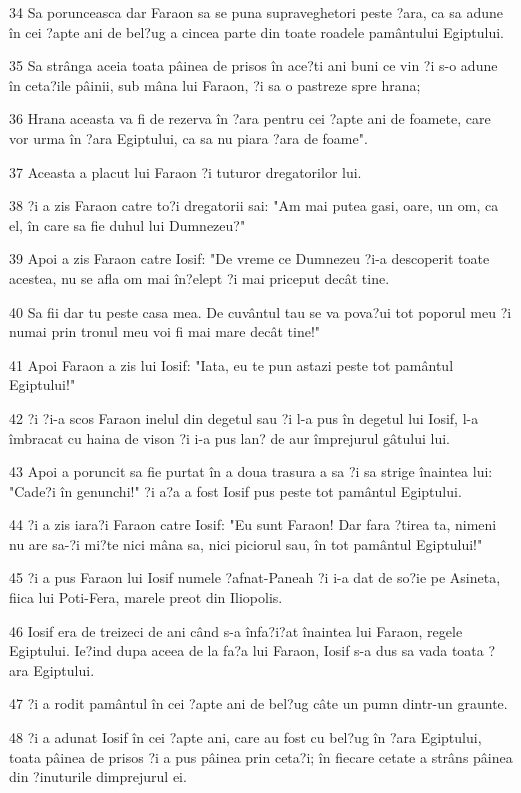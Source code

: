 \par 34 Sa porunceasca dar Faraon sa se puna supraveghetori peste ?ara, ca sa adune în cei ?apte ani de bel?ug a cincea parte din toate roadele pamântului Egiptului.
\par 35 Sa strânga aceia toata pâinea de prisos în ace?ti ani buni ce vin ?i s-o adune în ceta?ile pâinii, sub mâna lui Faraon, ?i sa o pastreze spre hrana;
\par 36 Hrana aceasta va fi de rezerva în ?ara pentru cei ?apte ani de foamete, care vor urma în ?ara Egiptului, ca sa nu piara ?ara de foame".
\par 37 Aceasta a placut lui Faraon ?i tuturor dregatorilor lui.
\par 38 ?i a zis Faraon catre to?i dregatorii sai: "Am mai putea gasi, oare, un om, ca el, în care sa fie duhul lui Dumnezeu?"
\par 39 Apoi a zis Faraon catre Iosif: "De vreme ce Dumnezeu ?i-a descoperit toate acestea, nu se afla om mai în?elept ?i mai priceput decât tine.
\par 40 Sa fii dar tu peste casa mea. De cuvântul tau se va pova?ui tot poporul meu ?i numai prin tronul meu voi fi mai mare decât tine!"
\par 41 Apoi Faraon a zis lui Iosif: "Iata, eu te pun astazi peste tot pamântul Egiptului!"
\par 42 ?i ?i-a scos Faraon inelul din degetul sau ?i l-a pus în degetul lui Iosif, l-a îmbracat cu haina de vison ?i i-a pus lan? de aur împrejurul gâtului lui.
\par 43 Apoi a poruncit sa fie purtat în a doua trasura a sa ?i sa strige înaintea lui: "Cade?i în genunchi!" ?i a?a a fost Iosif pus peste tot pamântul Egiptului.
\par 44 ?i a zis iara?i Faraon catre Iosif: "Eu sunt Faraon! Dar fara ?tirea ta, nimeni nu are sa-?i mi?te nici mâna sa, nici piciorul sau, în tot pamântul Egiptului!"
\par 45 ?i a pus Faraon lui Iosif numele ?afnat-Paneah ?i i-a dat de so?ie pe Asineta, fiica lui Poti-Fera, marele preot din Iliopolis.
\par 46 Iosif era de treizeci de ani când s-a înfa?i?at înaintea lui Faraon, regele Egiptului. Ie?ind dupa aceea de la fa?a lui Faraon, Iosif s-a dus sa vada toata ?ara Egiptului.
\par 47 ?i a rodit pamântul în cei ?apte ani de bel?ug câte un pumn dintr-un graunte.
\par 48 ?i a adunat Iosif în cei ?apte ani, care au fost cu bel?ug în ?ara Egiptului, toata pâinea de prisos ?i a pus pâinea prin ceta?i; în fiecare cetate a strâns pâinea din ?inuturile dimprejurul ei.
